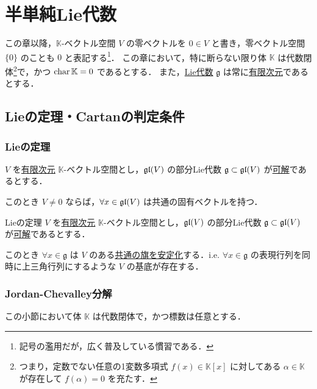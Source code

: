 \documentclass[rep_main]{subfiles}
\begin{document}
\setcounter{chapter}{1}

\chapter{半単純Lie代数}

この章以降，$\mathbb{K}$-ベクトル空間 $V$ の零ベクトルを $0 \in V$ と書き，零ベクトル空間 $\{0\}$ のことも $0$ と表記する\footnote{記号の濫用だが，広く普及している慣習である．}．
この章において，特に断らない限り体 $\mathbb{K}$ は代数閉体\footnote{つまり，定数でない任意の1変数多項式 $f(x) \in \mathbb{K}[x]$ に対してある $\alpha \in \mathbb{K}$ が存在して $f(\alpha) = 0$ を充たす．}で，かつ $\operatorname{char} \mathbb{K} = 0$ であるとする．
また，\hyperref[ax:LieAlg]{Lie代数} $\mathfrak{g}$ は常に\underline{有限次元}であるとする．
\section{Lieの定理・Cartanの判定条件}

\subsection{Lieの定理}

\begin{mytheo}[label=thm:eigen-Lie]{}
	$V$ を\underline{有限次元} $\mathbb{K}$-ベクトル空間とし，$\mathfrak{gl} (V)$ の部分Lie代数 $\mathfrak{g} \subset \mathfrak{gl} (V)$ が\hyperref[def:solvable-LieAlg]{可解}であるとする．

	このとき $V \neq 0$ ならば，$\forall x \in \mathfrak{gl} (V)$ は共通の固有ベクトルを持つ．
\end{mytheo}

\begin{mycol}[label=thm:Lie]{Lieの定理}
	$V$ を\underline{有限次元} $\mathbb{K}$-ベクトル空間とし，$\mathfrak{gl} (V)$ の部分Lie代数 $\mathfrak{g} \subset \mathfrak{gl} (V)$ が\hyperref[def:solvable-LieAlg]{可解}であるとする．

	このとき $\forall x \in \mathfrak{g}$ は $V$ のある\underline{共通の}\hyperref[def:flag]{旗を安定化}する．i.e. $\forall x \in \mathfrak{g}$ の表現行列を同時に上三角行列にするような $V$ の基底が存在する．
\end{mycol}


\subsection{Jordan-Chevalley分解}

この小節において体 $\mathbb{K}$ は代数閉体で，かつ標数は任意とする．
\end{document}
